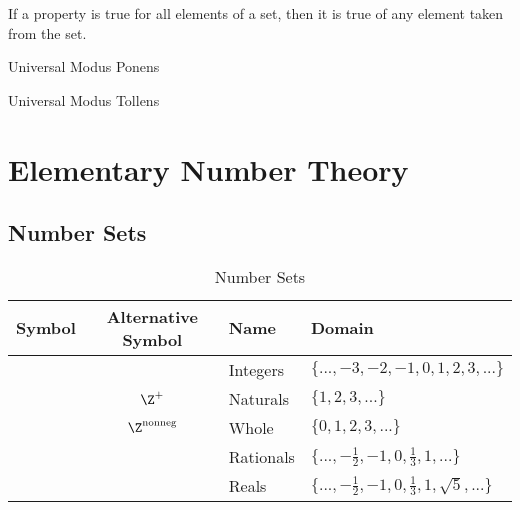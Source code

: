 \documentclass[11pt]{article}
\begin{document}
\begin{definition}\label{def:universal-instantiation}
    If a property is true for all elements of a set, then it is true of any element taken from the set.
\end{definition}

\begin{bbox}{\centering Universal Modus Ponens}
    \begin{center}
        \begin{argument}
    \end{argument}
    \end{center}
\end{bbox}

\begin{bbox}{\centering Universal Modus Tollens}
    \begin{center}
        \begin{argument}
    \end{argument}
    \end{center}
\end{bbox}

\section{Elementary Number Theory}

\subsection{Number Sets}

\begin{table}[!htbp]
    \centering
    \begin{tabular}{ c c l l }
        \toprule
        Symbol  & Alternative Symbol    & Name      & Domain \\
        \midrule
        \Z      &                       & Integers  & $\{ ..., -3,-2,-1,0,1,2,3, ... \}$ \\
        \N      & $\Z^+$                & Naturals  & $\{ 1,2,3, ... \}$ \\
        \W      & $\Z^{\text{nonneg}}$  & Whole     & $\{ 0,1,2,3, ... \}$ \\
        \Q      &                       & Rationals & $\{ ..., -\frac{1}{2}, -1, 0, \frac{1}{3}, 1, ... \}$ \\
        \R      &                       & Reals     & $\{ ..., -\frac{1}{2}, -1, 0, \frac{1}{3}, 1, \sqrt{5}, ... \}$ \\
        \bottomrule
    \end{tabular}
    \label{tab:tbl-number-sets}
    \caption{Number Sets}
\end{table}
\end{document}
